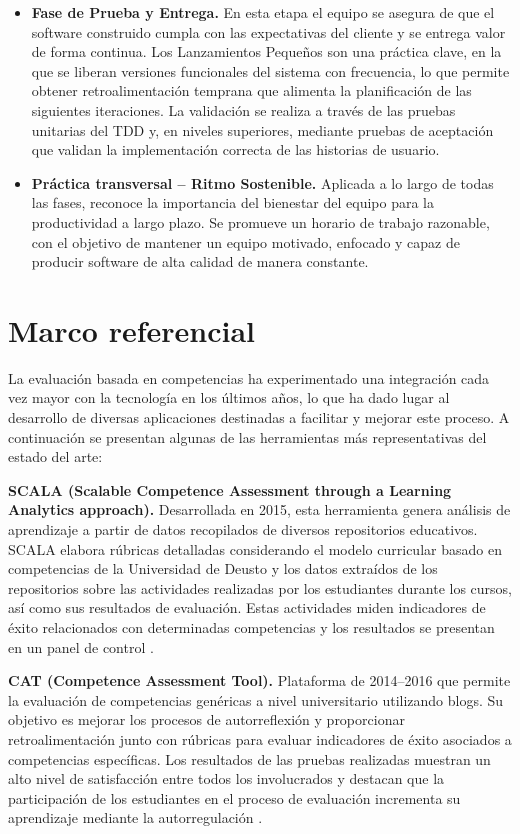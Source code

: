 \begin{itemize}[leftmargin=*]
\item \textbf{Fase de Prueba y Entrega.} En esta etapa el equipo se asegura de que el software construido cumpla con las expectativas del cliente y se entrega valor de forma continua. Los Lanzamientos Pequeños son una práctica clave, en la que se liberan versiones funcionales del sistema con frecuencia, lo que permite obtener retroalimentación temprana que alimenta la planificación de las siguientes iteraciones. La validación se realiza a través de las pruebas unitarias del TDD y, en niveles superiores, mediante pruebas de aceptación que validan la implementación correcta de las historias de usuario.

\item \textbf{Práctica transversal -- Ritmo Sostenible.} Aplicada a lo largo de todas las fases, reconoce la importancia del bienestar del equipo para la productividad a largo plazo. Se promueve un horario de trabajo razonable, con el objetivo de mantener un equipo motivado, enfocado y capaz de producir software de alta calidad de manera constante.
\end{itemize}

\section{Marco referencial}

La evaluación basada en competencias ha experimentado una integración cada vez mayor con la tecnología en los últimos años, lo que ha dado lugar al desarrollo de diversas aplicaciones destinadas a facilitar y mejorar este proceso. A continuación se presentan algunas de las herramientas más representativas del estado del arte:

\textbf{SCALA (Scalable Competence Assessment through a Learning Analytics approach).} Desarrollada en 2015, esta herramienta genera análisis de aprendizaje a partir de datos recopilados de diversos repositorios educativos. SCALA elabora rúbricas detalladas considerando el modelo curricular basado en competencias de la Universidad de Deusto y los datos extraídos de los repositorios sobre las actividades realizadas por los estudiantes durante los cursos, así como sus resultados de evaluación. Estas actividades miden indicadores de éxito relacionados con determinadas competencias y los resultados se presentan en un panel de control \cite{ref21_scala_universidad}.

\textbf{CAT (Competence Assessment Tool).} Plataforma de 2014--2016 que permite la evaluación de competencias genéricas a nivel universitario utilizando blogs. Su objetivo es mejorar los procesos de autorreflexión y proporcionar retroalimentación junto con rúbricas para evaluar indicadores de éxito asociados a competencias específicas. Los resultados de las pruebas realizadas muestran un alto nivel de satisfacción entre todos los involucrados y destacan que la participación de los estudiantes en el proceso de evaluación incrementa su aprendizaje mediante la autorregulación \cite{ref10_cat}.

